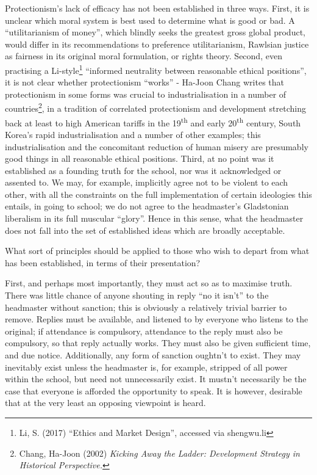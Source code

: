 \documentclass[12pt,a4paper]{report}
\newcounter{count}
\begin{document}
\begin{multicols}{2}
Protectionism's lack of efficacy has not been established in three ways.
First, it is unclear which moral system is best used to determine what
is good or bad. A ``utilitarianism of money'', which blindly seeks the
greatest gross global product, would differ in its recommendations to
preference utilitarianism, Rawlsian justice as fairness in its original
moral formulation, or rights theory. Second, even practising a
Li-style\footnote{Li, S. (2017) ``Ethics and Market Design'', accessed
	via shengwu.li} ``informed neutrality between reasonable ethical
positions'', it is not clear whether protectionism ``works'' - Ha-Joon
Chang writes that protectionism in some forms was crucial to
industrialisation in a number of countries\footnote{Chang, Ha-Joon
	(2002) \textit{Kicking Away the Ladder: Development Strategy in
		Historical Perspective.}}, in a tradition of correlated protectionism
and development stretching back at least to high American tariffs in the
19\textsuperscript{th} and early 20\textsuperscript{th} century, South
Korea's rapid industrialisation and a number of other examples; this
industrialisation and the concomitant reduction of human misery are
presumably good things in all reasonable ethical positions. Third, at no
point was it established as a founding truth for the school, nor was it
acknowledged or assented to. We may, for example, implicitly agree not
to be violent to each other, with all the constraints on the full
implementation of certain ideologies this entails, in going to school;
we do not agree to the headmaster's Gladstonian liberalism in its full
muscular ``glory''. Hence in this sense, what the headmaster does not
fall into the set of established ideas which are broadly acceptable.

What sort of principles should be applied to those who wish to depart
from what has been established, in terms of their presentation?

First, and perhaps most importantly, they must act so as to maximise
truth. There was little chance of anyone shouting in reply ``no it
isn't'' to the headmaster without sanction; this is obviously a
relatively trivial barrier to remove. Replies must be available, and
listened to by everyone who listens to the original; if attendance is
compulsory, attendance to the reply must also be compulsory, so that
reply actually works. They must also be given sufficient time, and due
notice. Additionally, any form of sanction oughtn't to exist. They may
inevitably exist unless the headmaster is, for example, stripped of all
power within the school, but need not unnecessarily exist. It mustn't
necessarily be the case that everyone is afforded the opportunity to
speak. It is however, desirable that at the very least an opposing
viewpoint is heard.


\end{multicols}
\end{document}
